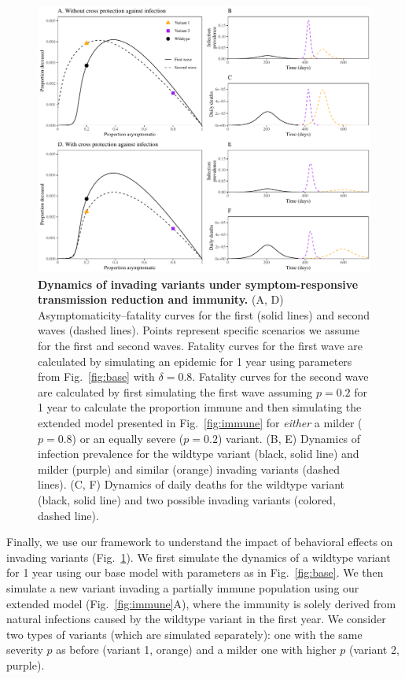 \documentclass[12pt]{article}
\newcommand{\fref}[1]{Fig.~\ref{fig:#1}}
\begin{document}
\begin{figure}[!ht]
\includegraphics[width=\textwidth]{figure_variant.ggp.pdf}
\caption{
\textbf{Dynamics of invading variants under symptom-responsive transmission reduction and immunity.}
(A, D) Asymptomaticity--fatality curves for the first (solid lines) and second waves (dashed lines).
Points represent specific scenarios we assume for the first and second waves.
Fatality curves for the first wave are calculated by simulating an epidemic for 1 year using parameters from \fref{base} with $\delta=0.8$.
Fatality curves for the second wave are calculated by first simulating the first wave assuming $p=0.2$ for 1 year to calculate the proportion immune and then simulating the extended model presented in \fref{immune} for \emph{either} a milder ($p=0.8$) or an equally severe ($p=0.2$) variant.
(B, E) Dynamics of infection prevalence for the wildtype variant (black, solid line) and milder (purple) and similar (orange) invading variants (dashed lines).
(C, F) Dynamics of daily deaths for the wildtype variant (black, solid line) and two possible invading variants (colored, dashed line).
}
\label{fig:variant}
\end{figure}

Finally, we use our framework to understand the impact of behavioral effects on invading variants (\fref{variant}).
We first simulate the dynamics of a wildtype variant for 1 year using our base model with parameters as in \fref{base}.
We then simulate a new variant invading a partially immune population using our extended model (\fref{immune}A), where the immunity is solely derived from natural infections caused by the wildtype variant in the first year.
We consider two types of variants (which are simulated separately): one with the same severity $p$ as before (variant 1, orange) and a milder one with higher $p$ (variant 2, purple).
\end{document}
